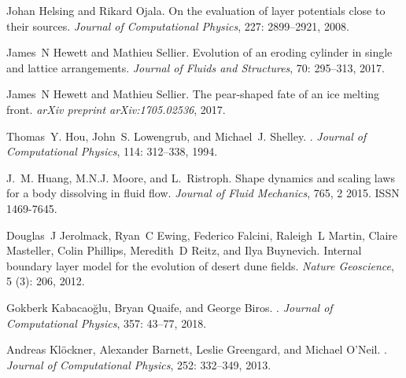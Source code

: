 \documentclass[preprint, 10pt]{elsarticle}
\begin{document}
\begin{thebibliography}{72}
Johan Helsing and Rikard Ojala.
\newblock On the evaluation of layer potentials close to their sources.
\newblock \emph{Journal of Computational Physics}, 227: 2899--2921,
  2008.

James~N Hewett and Mathieu Sellier.
\newblock Evolution of an eroding cylinder in single and lattice arrangements.
\newblock \emph{Journal of Fluids and Structures}, 70: 295--313,
  2017{}.

James~N Hewett and Mathieu Sellier.
\newblock The pear-shaped fate of an ice melting front.
\newblock \emph{arXiv preprint arXiv:1705.02536}, 2017{}.

Thomas~Y. Hou, John~S. Lowengrub, and Michael~J. Shelley.
.
\newblock \emph{Journal of Computational Physics}, 114: 312--338,
  1994.

J.~M. Huang, M.N.J. Moore, and L.~Ristroph.
\newblock Shape dynamics and scaling laws for a body dissolving in fluid flow.
\newblock \emph{Journal of Fluid Mechanics}, 765, 2 2015.
\newblock ISSN 1469-7645.

Douglas~J Jerolmack, Ryan~C Ewing, Federico Falcini, Raleigh~L Martin, Claire
  Masteller, Colin Phillips, Meredith~D Reitz, and Ilya Buynevich.
\newblock Internal boundary layer model for the evolution of desert dune
  fields.
\newblock \emph{Nature Geoscience}, 5 (3): 206, 2012.

Gokberk Kabacao\u{g}lu, Bryan Quaife, and George Biros.
.
\newblock \emph{Journal of Computational Physics}, 357: 43--77, 2018.

Andreas Kl\"{o}ckner, Alexander Barnett, Leslie Greengard, and Michael O'Neil.
.
\newblock \emph{Journal of Computational Physics}, 252: 332--349,
  2013.


\end{thebibliography}
\end{document}
